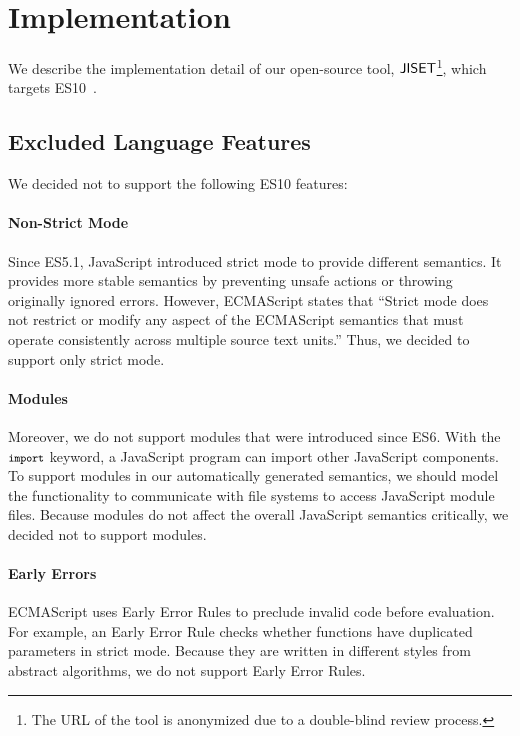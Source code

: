 \section{Implementation}\label{sec:impl}
We describe the implementation detail of our open-source
tool, \( \text{\sf JISET} \)\footnote{The URL of the tool is anonymized due to a
double-blind review process.}, which targets ES10~\cite{es10}.


\subsection{Excluded Language Features}\label{sec:exclusion}
We decided not to support the following ES10 features:

\vspace*{-.5em}
\paragraph{Non-Strict Mode}
Since ES5.1, JavaScript introduced strict mode to
provide different semantics.  It
provides more stable semantics by preventing unsafe actions or
throwing originally ignored errors.  However, ECMAScript
states that ``Strict mode does not restrict or modify
any aspect of the ECMAScript semantics that must operate consistently
across multiple source text units.''  Thus, we decided to support only
strict mode.

\vspace*{-.5em}
\paragraph{Modules}
Moreover, we do not support modules that were introduced since ES6.
With the \( \texttt{\footnotesize import} \) keyword, a JavaScript
program can import other JavaScript components.  To support
modules in our automatically generated semantics, we should model the
functionality to communicate with file systems to access JavaScript
module files.  Because modules do not affect the overall JavaScript
semantics critically, we decided not to support modules.

\vspace*{-.5em}
\paragraph{Early Errors}
ECMAScript uses Early Error Rules to preclude invalid code
before evaluation. For example, an Early Error Rule checks whether
functions have duplicated parameters in strict mode.
Because they are written in different styles from abstract algorithms,
we do not support Early Error Rules.

